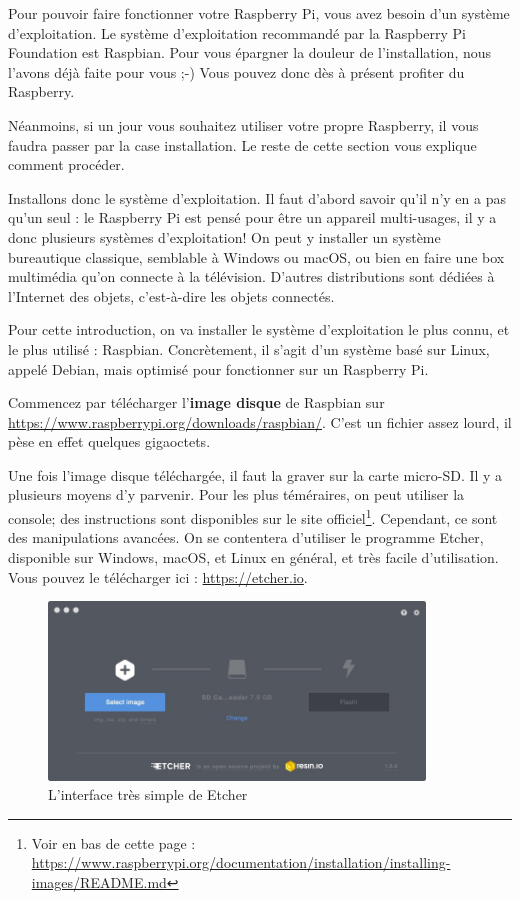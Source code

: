 Pour pouvoir faire fonctionner votre Raspberry Pi, vous avez besoin d'un système d'exploitation. Le système d'exploitation recommandé par la Raspberry Pi Foundation est Raspbian. Pour vous épargner la douleur de l'installation, nous l'avons déjà faite pour vous ;-) Vous pouvez donc dès à présent profiter du Raspberry.

Néanmoins, si un jour vous souhaitez utiliser votre propre Raspberry, il vous faudra passer par la case installation. Le reste de cette section vous explique comment procéder.

Installons donc le système d'exploitation. Il faut d'abord savoir qu'il n'y en a pas qu'un seul : le Raspberry Pi est pensé pour être un appareil multi-usages, il y a donc plusieurs systèmes d'exploitation! On peut y installer un système bureautique classique, semblable à Windows ou macOS, ou bien en faire une box multimédia qu'on connecte à la télévision. D'autres distributions sont dédiées à l'Internet des objets, c'est-à-dire les objets connectés.

Pour cette introduction, on va installer le système d'exploitation le plus connu, et le plus utilisé : Raspbian. Concrètement, il s'agit d'un système basé sur Linux, appelé Debian, mais optimisé pour fonctionner sur un Raspberry Pi.

Commencez par télécharger l'\textbf{image disque} de Raspbian sur \url{https://www.raspberrypi.org/downloads/raspbian/}. C'est un fichier assez lourd, il pèse en effet quelques gigaoctets.

Une fois l'image disque téléchargée, il faut la graver sur la carte micro-SD. Il y a plusieurs moyens d'y parvenir. Pour les plus téméraires, on peut utiliser la console; des instructions sont disponibles sur le site officiel\footnote{Voir en bas de cette page : \url{https://www.raspberrypi.org/documentation/installation/installing-images/README.md}}. Cependant, ce sont des manipulations avancées. On se contentera d'utiliser le programme Etcher, disponible sur Windows, macOS, et Linux en général, et très facile d'utilisation. Vous pouvez le télécharger ici : \url{https://etcher.io}.

\begin{figure}[h!]
\begin{center}
\includegraphics[width=10cm]{etcher.jpg}
\end{center}
\caption{L'interface très simple de Etcher}
\label{etcher}
\end{figure}

